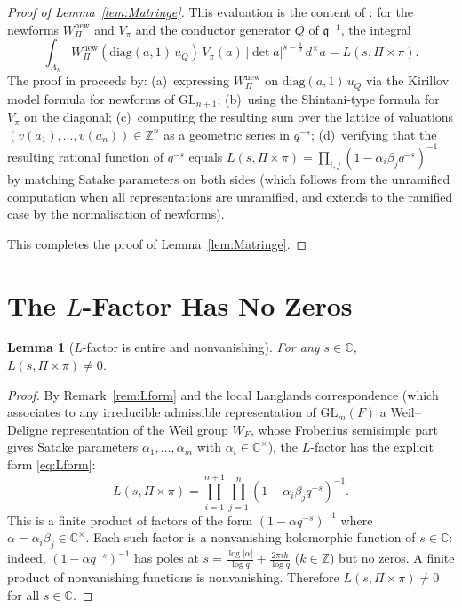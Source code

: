 \documentclass[12pt]{article}
\newtheorem{lemma}[theorem]{Lemma}
\begin{document}
\begin{proof}[Proof of Lemma~\ref{lem:Matringe}]
This evaluation is the content of \cite[Theorem~1.1]{Matringe13}: for the
newforms $W_\Pi^{\mathrm{new}}$ and $V_\pi$ and the conductor generator $Q$
of $\mathfrak{q}^{-1}$, the integral
\[
  \int_{A_n} W_\Pi^{\mathrm{new}}\!\left(\mathrm{diag}(a,1)\,u_Q\right)\,
  V_\pi(a)\, |\det a|^{s-\frac{1}{2}}\, d^\times a
  = L(s,\Pi\times\pi).
\]
The proof in \cite{Matringe13} proceeds by:
(a)~expressing $W_\Pi^{\mathrm{new}}$ on $\mathrm{diag}(a,1)\,u_Q$ via the
Kirillov model formula for newforms of $\mathrm{GL}_{n+1}$;
(b)~using the Shintani-type formula for $V_\pi$ on the diagonal;
(c)~computing the resulting sum over the lattice of valuations $(v(a_1),\ldots,v(a_n))
\in \mathbb{Z}^n$ as a geometric series in $q^{-s}$;
(d)~verifying that the resulting rational function of $q^{-s}$ equals
$L(s,\Pi\times\pi) = \prod_{i,j}(1-\alpha_i\beta_j q^{-s})^{-1}$
by matching Satake parameters on both sides (which follows from the unramified
computation when all representations are unramified, and extends to the
ramified case by the normalisation of newforms).

This completes the proof of Lemma~\ref{lem:Matringe}.
\end{proof}

\section{The \texorpdfstring{$L$}{L}-Factor Has No Zeros}

\begin{lemma}[$L$-factor is entire and nonvanishing]\label{lem:Lnonzero}
For any $s \in \mathbb{C}$, $L(s,\Pi\times\pi) \neq 0$.
\end{lemma}

\begin{proof}
By Remark~\ref{rem:Lform} and the local Langlands correspondence
\cite{HT01,Hen00} (which associates to any irreducible admissible representation
of $\mathrm{GL}_m(F)$ a Weil--Deligne representation of the Weil group $W_F$,
whose Frobenius semisimple part gives Satake parameters $\alpha_1,\ldots,\alpha_m$
with $\alpha_i \in \mathbb{C}^\times$), the $L$-factor has the explicit form
\eqref{eq:Lform}:
\[
  L(s,\Pi\times\pi)
  = \prod_{i=1}^{n+1}\prod_{j=1}^{n} (1 - \alpha_i\beta_j q^{-s})^{-1}.
\]
This is a finite product of factors of the form $(1-\alpha q^{-s})^{-1}$ where
$\alpha = \alpha_i\beta_j \in \mathbb{C}^\times$.  Each such factor is a
nonvanishing holomorphic function of $s \in \mathbb{C}$: indeed, $(1-\alpha q^{-s})^{-1}$
has poles at $s = \frac{\log|\alpha|}{\log q} + \frac{2\pi i k}{\log q}$
($k \in \mathbb{Z}$) but no zeros.  A finite product of nonvanishing functions
is nonvanishing.  Therefore $L(s,\Pi\times\pi) \neq 0$ for all $s \in
\mathbb{C}$.
\end{proof}
\end{document}

